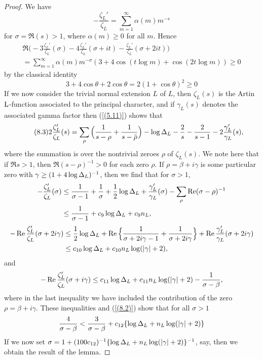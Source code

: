 \documentclass[./main]{subfiles}
\begin{document}
\begin{proof}
We have 
\[\tag{8.2}\label{(8.2)} -\frac{\zeta_L'}{\zeta_L} = \sum_{m=1}^{\infty} \alpha(m)m^{-s}
\]
for $\sigma = \Re(s) > 1$, where $\alpha(m) \geq 0$ for all $m$. Hence 
\begin{multline*}
    \Re\Big(-3\frac{\zeta_L'}{\zeta_L}(\sigma) - 4 \frac{\zeta_L'}{\zeta_L}(\sigma + it) - \frac{\zeta_L'}{\zeta_L}(\sigma + 2it)\Big) \\
    = \sum_{m=1}^{\infty} \alpha(m)m^{-\sigma}(3 + 4\cos(t \log m) + \cos(2t \log m)) \geq 0
\end{multline*}
by the classical identity
\[ 3 + 4\cos \theta + 2 \cos \theta = 2(1 + \cos \theta)^2 \geq 0
\]
If we now consider the trivial normal extension $L$ of $L$, then $\zeta_L(s)$ is the Artin $\operatorname{L}$-function associated to the principal character, and if $\gamma_L(s)$ denotes the associated gamma factor then (\ref{(5.11)}) shows that 
\[\tag{8.3}\label{(8.3)} 2 \frac{\zeta_L'}{\zeta_L}(s) = \sum_{\rho} \Big(\frac{1}{s-\rho} + \frac{1}{s-\xoverline{\rho}}\Big) - \log \disc_L - \frac{2}{s} - \frac{2}{s-1} - 2 \frac{\gamma_L'}{\gamma_L}(s),
\]
where the summation is over the nontrivial zeroes $\rho$ of $\zeta_L(s)$. We note here that if $\Re s > 1$, then $\Re(s-\rho)^{-1} > 0$ for each zero $\rho$. If $\rho = \beta + i \gamma$ is some particular zero with $\gamma \geq (1 + 4 \log \Delta_L)^{-1}$, then we find that for $\sigma > 1$, 
\begin{align*}
    -\frac{\zeta_L'}{\zeta_L}(\sigma) &\leq \frac{1}{\sigma - 1} + \frac{1}{\sigma} + \frac{1}{2}\log \Delta_L + \frac{\gamma_L'}{\gamma_L}(\sigma) - \sum_{\rho} \operatorname{Re}(\sigma - \rho)^{-1} \\
    &\leq \frac{1}{\sigma - 1} + c_9 \log \Delta_L + c_9n_L,
\end{align*}
\begin{align*}
    -\operatorname{Re} \frac{\zeta_L'}{\zeta_L}(\sigma + 2 i\gamma) &\leq \frac{1}{2} \log \Delta_L + \operatorname{Re} \Big\{\frac{1}{\sigma + 2i\gamma -1} + \frac{1}{\sigma + 2 i \gamma} \Big\} + \operatorname{Re} \frac{\gamma_L'}{\gamma_L}(\sigma + 2 i \gamma) \\
   & \leq c_{10} \log \Delta_L + c_{10} n_L \log(|\gamma| + 2),
\end{align*}
and 
\[-\operatorname{Re} \frac{\zeta_L'}{\zeta_L}(\sigma + i \gamma) \leq c_{11} \log \Delta_L + c_{11}n_L \log(|\gamma| + 2) - \frac{1}{\sigma - \beta},
\]
where in the last inequality we have included the contribution of the zero \newline $\rho = \beta + i \gamma$. These inequalities and (\ref{(8.2)}) show that for all $\sigma > 1$
\[ \frac{4}{\sigma - \beta} < \frac{3}{\sigma - \beta} + c_{12}\{\log \Delta_L + n_L \log(|\gamma| + 2) \}
\]
If we now set $\sigma = 1 + (100c_{12})^{-1}\{\log \Delta_L + n_L \log(|\gamma|+2)\}^{-1}$, say, then we obtain the result of the lemma.
\end{proof}
\end{document}
